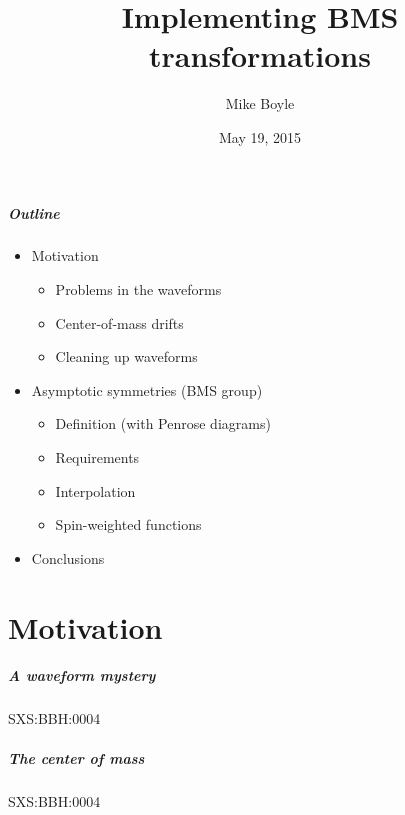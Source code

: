 \documentclass[12pt,xcolor={dvipsnames}]{beamer}
\title{Implementing BMS transformations}
\author[Mike Boyle] {Mike Boyle}
\date{May 19, 2015}
\begin{document}
\begin{frame}[plain]
  \titlepage
\end{frame}



\begin{frame}
  \frametitle{Outline}
  \begin{itemize}
  \item Motivation
    \begin{itemize}
    \item Problems in the waveforms
    \item Center-of-mass drifts
    \item Cleaning up waveforms
    \end{itemize}
  \item Asymptotic symmetries (BMS group)
    \begin{itemize}
    \item Definition (with Penrose diagrams)
    \item Requirements
    \item Interpolation
    \item Spin-weighted functions
    \end{itemize}
  \item Conclusions
  \end{itemize}
\end{frame}



\part{Motivation}
\partpage


\begin{frame}
  \frametitle{A waveform mystery}
  SXS:BBH:0004
\end{frame}

\begin{frame}
  \frametitle{The center of mass}
  SXS:BBH:0004
\end{frame}
\end{document}
